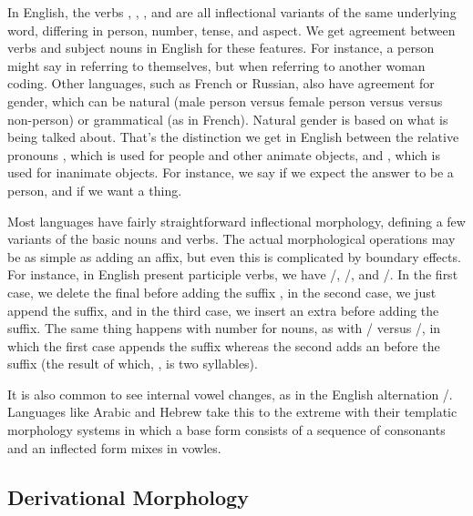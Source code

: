In English, the verbs , , , and
 are all inflectional variants of the same underlying word,
differing in person, number, tense, and aspect.  We get agreement
between verbs and subject nouns in English for these features.  For
instance, a person might say  in referring to
themselves, but  when referring to another
woman coding.  Other languages, such as French or Russian, also have
agreement for gender, which can be natural (male person versus female
person versus versus non-person) or grammatical (as in French).
Natural gender is based on what is being talked about.  That's the
distinction we get in English between the relative pronouns
, which is used for people and other animate
objects, and , which is used for inanimate
objects.  For instance, we say  if
we expect the answer to be a person, and 
 if we want a thing.

Most languages have fairly straightforward inflectional morphology,
defining a few variants of the basic nouns and verbs.  The actual
morphological operations may be as simple as adding an affix, but even
this is complicated by boundary effects.  For instance, in English
present participle verbs, we have
/,
/, and /.
In the first case, we delete the final  before adding
the suffix , in the second case, we just append
the suffix, and in the third case, we insert an extra 
before adding the suffix.  The same thing happens with number for
nouns, as with / versus
/, in which the first case
appends the suffix  whereas the second adds an
 before the suffix (the result of which, ,
is two syllables).

It is also common to see internal vowel changes, as in the English
alternation /.  Languages
like Arabic and Hebrew take this to the extreme with their
templatic morphology systems in which a base form consists of
a sequence of consonants and an inflected form mixes in vowles.


\subsection{Derivational Morphology}

